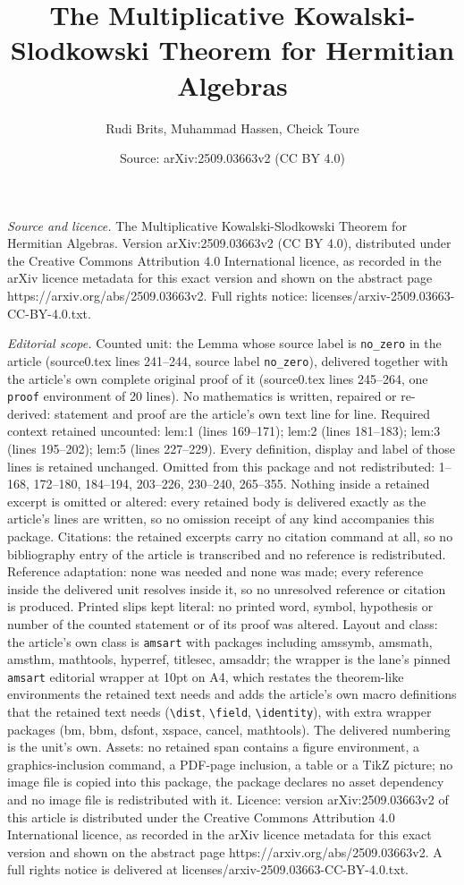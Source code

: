 \documentclass[10pt,a4paper]{amsart}
\title[The Multiplicative Kowalski-Slodkowski Theorem for Hermitian]{The Multiplicative Kowalski-Slodkowski Theorem for Hermitian Algebras}
\author{Rudi Brits, Muhammad Hassen, Cheick Toure}
\date{Source: arXiv:2509.03663v2 (CC BY 4.0)}
\begin{document}
\maketitle

\noindent\emph{Source and licence.} The Multiplicative Kowalski-Slodkowski Theorem for Hermitian Algebras. Version arXiv:2509.03663v2 (CC BY 4.0), distributed under the Creative Commons Attribution 4.0 International licence, as recorded in the arXiv licence metadata for this exact version and shown on the abstract page https://arxiv.org/abs/2509.03663v2. Full rights notice: licenses/arxiv-2509.03663-CC-BY-4.0.txt.\par\smallskip

\noindent\textit{Editorial scope.} Counted unit: the Lemma whose source label is \texttt{no\_zero} in the article (source0.tex lines 241--244, source label \texttt{no\_zero}), delivered together with the article's own complete original proof of it (source0.tex lines 245--264, one \texttt{proof} environment of 20 lines). No mathematics is written, repaired or re-derived: statement and proof are the article's own text line for line. Required context retained uncounted: lem:1 (lines 169--171); lem:2 (lines 181--183); lem:3 (lines 195--202); lem:5 (lines 227--229). Every definition, display and label of those lines is retained unchanged. Omitted from this package and not redistributed: 1--168, 172--180, 184--194, 203--226, 230--240, 265--355. Nothing inside a retained excerpt is omitted or altered: every retained body is delivered exactly as the article's lines are written, so no omission receipt of any kind accompanies this package. Citations: the retained excerpts carry no citation command at all, so no bibliography entry of the article is transcribed and no reference is redistributed. Reference adaptation: none was needed and none was made; every reference inside the delivered unit resolves inside it, so no unresolved reference or citation is produced. Printed slips kept literal: no printed word, symbol, hypothesis or number of the counted statement or of its proof was altered. Layout and class: the article's own class is \texttt{amsart} with packages including amssymb, amsmath, amsthm, mathtools, hyperref, titlesec, amsaddr; the wrapper is the lane's pinned \texttt{amsart} editorial wrapper at 10pt on A4, which restates the theorem-like environments the retained text needs and adds the article's own macro definitions that the retained text needs (\texttt{\textbackslash dist}, \texttt{\textbackslash field}, \texttt{\textbackslash identity}), with extra wrapper packages (bm, bbm, dsfont, xspace, cancel, mathtools). The delivered numbering is the unit's own. Assets: no retained span contains a figure environment, a graphics-inclusion command, a PDF-page inclusion, a table or a TikZ picture; no image file is copied into this package, the package declares no asset dependency and no image file is redistributed with it. Licence: version arXiv:2509.03663v2 of this article is distributed under the Creative Commons Attribution 4.0 International licence, as recorded in the arXiv licence metadata for this exact version and shown on the abstract page https://arxiv.org/abs/2509.03663v2. A full rights notice is delivered at licenses/arxiv-2509.03663-CC-BY-4.0.txt. 
\end{document}
